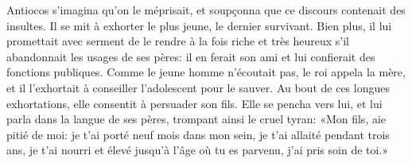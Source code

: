 Antiocos s’imagina qu’on le méprisait,
	et soupçonna que ce discours contenait des insultes.
Il se mit à exhorter le plus jeune, le dernier survivant.
Bien plus, il lui promettait avec serment de le rendre à la fois riche et très heureux
	s’il abandonnait les usages de ses pères:
	il en ferait son ami et lui confierait des fonctions publiques.
Comme le jeune homme n’écoutait pas, le roi appela la mère,
	et il l’exhortait à conseiller l’adolescent pour le sauver.
Au bout de ces longues exhortations, elle consentit à persuader son fils.
Elle se pencha vers lui, et lui parla dans la langue de ses pères,
	trompant ainsi le cruel tyran:
	«Mon fils, aie pitié de moi:
	je t’ai porté neuf mois dans mon sein, je t’ai allaité pendant trois ans,
	je t’ai nourri et élevé jusqu’à l’âge où tu es parvenu, j’ai pris soin de toi.»

